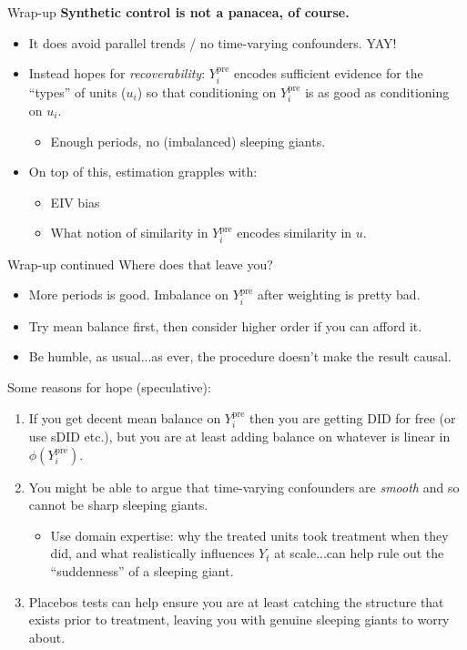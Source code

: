 \documentclass[handout,xcolor=dvipsnames,pdftex,hyperref={colorlinks=false}]{beamer}
\newcommand\makegaps{\addtolength{\itemsep}{.25\baselineskip}}
\newcommand{\ypre}{Y^{\text{pre}}_i}      %
\begin{document}
\begin{frame}{Wrap-up}
\textbf{Synthetic control is not a panacea, of course.}\\[1ex]
\begin{itemize}\makegaps
\item<2-> It does avoid parallel trends / no time-varying confounders. YAY!
\item<3-> Instead hopes for \textit{recoverability}: $\ypre$ encodes sufficient evidence for the ``types'' of units ($u_i$) so that conditioning on $\ypre$ is as good as conditioning on $u_i$.
\begin{itemize}
\item Enough periods, no (imbalanced) sleeping giants.
\end{itemize}
\item<4-> On top of this, estimation grapples with: 
\begin{itemize}
\item EIV bias
\item  What notion of similarity in $\ypre$ encodes similarity in $u$.
\end{itemize}
\end{itemize}
\end{frame}

\begin{frame}{Wrap-up continued}
 Where does that leave you?\\
\footnotesize
\begin{itemize}\makegaps
\item<1-> More periods is good. Imbalance on $\ypre$ after weighting is pretty bad.
\item<2-> Try mean balance first, then consider higher order if you can afford it. 
\item<3-> Be humble, as usual...as ever, the procedure doesn't make the result causal.
\end{itemize}
\normalsize
\medskip
{} Some reasons for hope (speculative):\\
\footnotesize
\begin{enumerate}
\item<3-> If you get decent mean balance on $\ypre$ then you are getting DID for free (or use sDID etc.), but you are at least adding balance on whatever is linear in $\phi(\ypre)$.
\item<4-> You might be able to argue that time-varying confounders are \textit{smooth} and so cannot be sharp sleeping giants. 
\begin{itemize} 
  \footnotesize
  \item Use domain expertise: why the treated units took treatment when they did, and what realistically influences $Y_t$ at scale...can help rule out the ``suddenness'' of a sleeping giant.
\end{itemize}
\item<5-> Placebos tests can help ensure you are at least catching the structure that exists prior to treatment, leaving you with genuine sleeping giants to worry about. 
\end{enumerate}
\end{frame}
\end{document}
